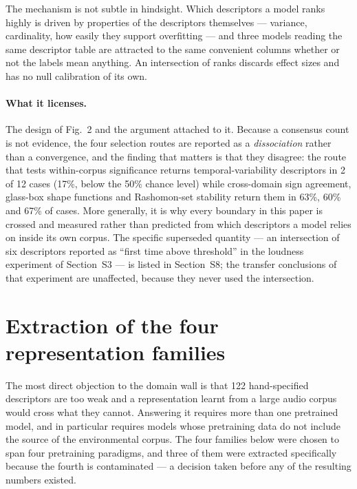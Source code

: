 The mechanism is not subtle in hindsight. Which descriptors a model ranks highly is
driven by properties of the descriptors themselves --- variance, cardinality, how
easily they support overfitting --- and three models reading the same descriptor table
are attracted to the same convenient columns whether or not the labels mean anything.
An intersection of ranks discards effect sizes and has no null calibration of its own.

\paragraph{What it licenses.}
The design of Fig.~2 and the argument attached to it. Because a consensus count is not
evidence, the four selection routes are reported as a \emph{dissociation} rather than a
convergence, and the finding that matters is that they disagree: the route that tests
within-corpus significance returns temporal-variability descriptors in 2 of 12 cases
(17\%, below the 50\% chance level) while cross-domain sign agreement, glass-box shape
functions and Rashomon-set stability return them in 63\%, 60\% and 67\% of cases.
More generally, it is why every boundary in this paper is crossed and measured rather
than predicted from which descriptors a model relies on inside its own corpus. The
specific superseded quantity --- an intersection of six descriptors reported as ``first
time above threshold'' in the loudness experiment of Section~S3 --- is listed in
Section~S8; the transfer conclusions of that experiment are unaffected, because they
never used the intersection.

\section{Extraction of the four representation families}

The most direct objection to the domain wall is that 122 hand-specified descriptors are
too weak and a representation learnt from a large audio corpus would cross what they
cannot. Answering it requires more than one pretrained model, and in particular
requires models whose pretraining data do not include the source of the environmental
corpus. The four families below were chosen to span four pretraining paradigms, and
three of them were extracted specifically because the fourth is contaminated --- a
decision taken before any of the resulting numbers existed.

